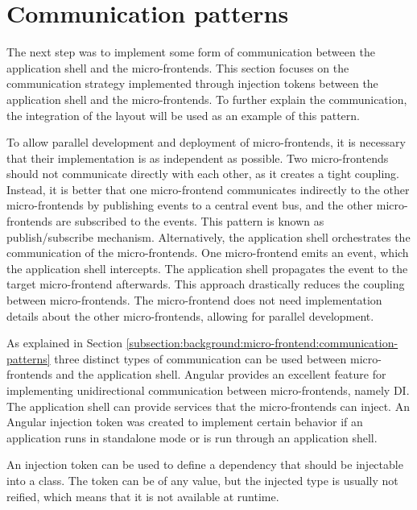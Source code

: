 \section{Communication patterns}\label{section:applied-methods:communication-shell-remote}

The next step was to implement some form of communication between the application shell and the micro-frontends. This section focuses on the communication strategy implemented through injection tokens between the application shell and the micro-frontends. To further explain the communication, the integration of the layout will be used as an example of this pattern.

\bigskip

\noindent To allow parallel development and deployment of micro-frontends, it is necessary that their implementation is as independent as possible. Two micro-frontends should not communicate directly with each other, as it creates a tight coupling. Instead, it is better that one micro-frontend communicates indirectly to the other micro-frontends by publishing events to a central event bus, and the other micro-frontends are subscribed to the events. This pattern is known as publish/subscribe mechanism. Alternatively, the application shell orchestrates the communication of the micro-frontends. One micro-frontend emits an event, which the application shell intercepts. The application shell propagates the event to the target micro-frontend afterwards. This approach drastically reduces the coupling between micro-frontends. The micro-frontend does not need implementation details about the other micro-frontends, allowing for parallel development.

\bigskip

\noindent As explained in Section \ref{subsection:background:micro-frontend:communication-patterns} three distinct types of communication can be used between micro-frontends and the application shell. Angular provides an excellent feature for implementing unidirectional communication between micro-frontends, namely \ac{DI}. The application shell can provide services that the micro-frontends can inject. An Angular injection token was created to implement certain behavior if an application runs in standalone mode or is run through an application shell.

\noindent An injection token can be used to define a dependency that should be injectable into a class. The token can be of any value, but the injected type is usually not reified, which means that it is not available at runtime. \cite{misc:-:applied-methods:communication:angular-injection-token}


